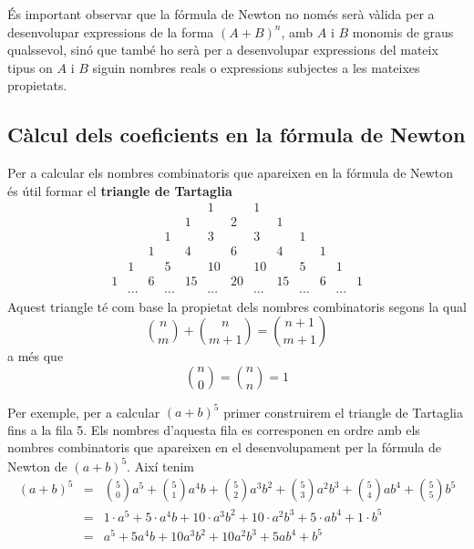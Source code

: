 És important observar que la fórmula de Newton no només serà vàlida per a desenvolupar expressions de la forma $(A+B)^{n}$, amb $A$ i $B$
monomis de graus qualssevol, sinó que també ho serà per a
desenvolupar expressions del mateix tipus on $A$ i $B$ siguin nombres
reals o expressions subjectes a les mateixes propietats.

\subsection{Càlcul dels coeficients en la fórmula de Newton}

Per a calcular els nombres combinatoris que apareixen en la fórmula
de Newton és útil formar el \textbf{triangle de Tartaglia}\begin{equation*}
\begin{array}{ccccccccccccc}
& & & & & 1 & & 1 & & & & & \\
& & & & 1 & & 2 & & 1 & & & & \\
& & & 1 & & 3 & & 3 & & 1 & & & \\
& & 1 & & 4 & & 6 & & 4 & & 1 & & \\
& 1 & & 5 & & 10 & & 10 & & 5 & & 1 & \\
1 & & 6 & & 15 & & 20 & & 15 & & 6 & & 1 \\
& \cdots & & \cdots & & \cdots & & \cdots & & \cdots & & \cdots &
\end{array}\end{equation*}Aquest triangle té com base la propietat dels nombres
combinatoris segons la qual\begin{equation*}
\binom{n}{m}+\binom{n}{m+1}=\binom{n+1}{m+1}
\end{equation*}a més que\begin{equation*}
\binom{n}{0}=\binom{n}{n}=1
\end{equation*}

Per exemple, per a calcular $(a+b)^{5}$ primer construirem el triangle de Tartaglia fins a la fila 5. Els nombres d'aquesta fila es
corresponen en ordre amb els nombres combinatoris que apareixen en el
desenvolupament per la fórmula de Newton de $(a+b)^{5}$. Així tenim\begin{eqnarray*}
(a+b)^{5} &=&\binom{5}{0}a^{5}+\binom{5}{1}a^{4}b+\binom{5}{2}a^{3}b^{2}+\binom{5}{3}a^{2}b^{3}+\binom{5}{4}ab^{4}+\binom{5}{5}b^{5} \\
&=&1\cdot a^{5}+5\cdot a^{4}b+10\cdot a^{3}b^{2}+10\cdot a^{2}b^{3}+5\cdot
ab^{4}+1\cdot b^{5} \\
&=&a^{5}+5a^{4}b+10a^{3}b^{2}+10a^{2}b^{3}+5ab^{4}+b^{5}
\end{eqnarray*}


